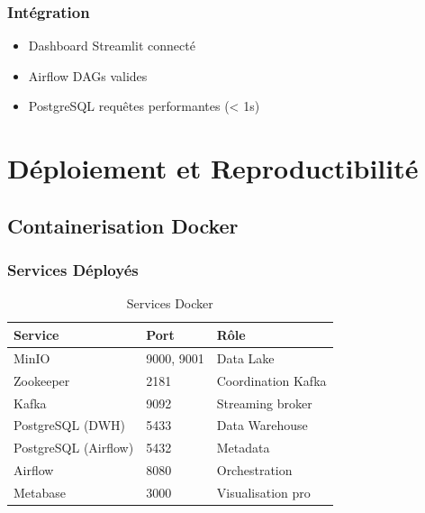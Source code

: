 \documentclass[12pt,a4paper]{report}
\begin{document}
\subsection{Intégration}

\begin{itemize}
    \item[✓] Dashboard Streamlit connecté
    \item[✓] Airflow DAGs valides
    \item[✓] PostgreSQL requêtes performantes (< 1s)
\end{itemize}


\chapter{Déploiement et Reproductibilité}

\section{Containerisation Docker}

\subsection{Services Déployés}

\begin{table}[H]
    \centering
    \begin{tabular}{lll}
        \toprule
        \textbf{Service}     & \textbf{Port} & \textbf{Rôle}      \\
        \midrule
        MinIO                & 9000, 9001    & Data Lake          \\
        Zookeeper            & 2181          & Coordination Kafka \\
        Kafka                & 9092          & Streaming broker   \\
        PostgreSQL (DWH)     & 5433          & Data Warehouse     \\
        PostgreSQL (Airflow) & 5432          & Metadata           \\
        Airflow              & 8080          & Orchestration      \\
        Metabase             & 3000          & Visualisation pro  \\
        \bottomrule
    \end{tabular}
    \caption{Services Docker}
\end{table}
\end{document}
